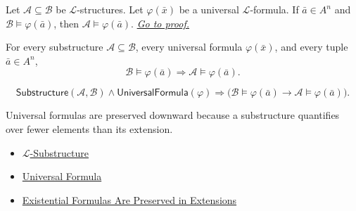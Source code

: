 \begin{proposition}\label{prop:universal-formulas-preserved-in-substructures}
Let $\mathcal{A}\subseteq\mathcal{B}$ be $\mathcal{L}$-structures. Let
$\varphi(\bar x)$ be a universal $\mathcal{L}$-formula. If
$\bar a\in A^n$ and $\mathcal{B}\models\varphi(\bar a)$, then
$\mathcal{A}\models\varphi(\bar a)$.
\hyperref[prf:universal-formulas-preserved-in-substructures]{\textit{Go to proof.}}
\end{proposition}

\begin{remark*}
For every substructure $\mathcal{A}\subseteq\mathcal{B}$, every universal
formula $\varphi(\bar x)$, and every tuple $\bar a\in A^n$,
\[
  \mathcal{B}\models\varphi(\bar a)
  \Longrightarrow
  \mathcal{A}\models\varphi(\bar a).
\]
\end{remark*}

\begin{remark*}
\[
\mathsf{Substructure}(\mathcal{A},\mathcal{B})
\land
\mathsf{UniversalFormula}(\varphi)
\Longrightarrow
\bigl(\mathcal{B}\models\varphi(\bar a)
\to
\mathcal{A}\models\varphi(\bar a)\bigr).
\]
\end{remark*}

\begin{remark*}[Interpretation]
Universal formulas are preserved downward because a substructure quantifies
over fewer elements than its extension.
\end{remark*}

\begin{dependencies}
\begin{itemize}
  \item \hyperref[def:l-substructure]{$\mathcal{L}$-Substructure}
  \item \hyperref[def:universal-formula]{Universal Formula}
  \item \hyperref[prop:existential-formulas-preserved-in-extensions]{Existential Formulas Are Preserved in Extensions}
\end{itemize}
\end{dependencies}
